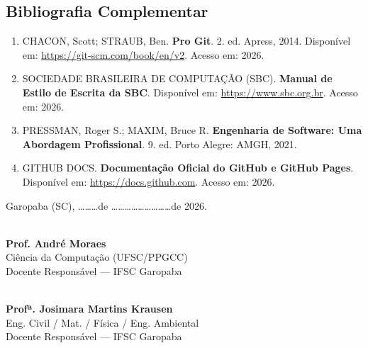 \documentclass[12pt,a4paper]{article}
\begin{document}
\subsection{Bibliografia Complementar}
\begin{enumerate}[leftmargin=*]
    \item CHACON, Scott; STRAUB, Ben. \textbf{Pro Git}. 2. ed. Apress, 2014. Disponível em: \url{https://git-scm.com/book/en/v2}. Acesso em: 2026.
    \item SOCIEDADE BRASILEIRA DE COMPUTAÇÃO (SBC). \textbf{Manual de Estilo de Escrita da SBC}. Disponível em: \url{https://www.sbc.org.br}. Acesso em: 2026.
    \item PRESSMAN, Roger S.; MAXIM, Bruce R. \textbf{Engenharia de Software: Uma Abordagem Profissional}. 9. ed. Porto Alegre: AMGH, 2021.
    \item GITHUB DOCS. \textbf{Documentação Oficial do GitHub e GitHub Pages}. Disponível em: \url{https://docs.github.com}. Acesso em: 2026.
\end{enumerate}

\vspace{1.2cm}

\begin{center}
\small
Garopaba (SC), \dots\dots\dots de \dots\dots\dots\dots\dots\dots\dots\dots\dots de 2026.

\vspace{1.8cm}

\begin{minipage}{0.45\textwidth}
\centering
\hrulefill \\
\textbf{Prof. André Moraes}\\
Ciência da Computação (UFSC/PPGCC)\\
Docente Responsável — IFSC Garopaba
\end{minipage}
\hfill
\begin{minipage}{0.45\textwidth}
\centering
\hrulefill \\
\textbf{Profª. Josimara Martins Krausen}\\
Eng. Civil / Mat. / Física / Eng. Ambiental\\
Docente Responsável — IFSC Garopaba
\end{minipage}
\end{center}
\end{document}
